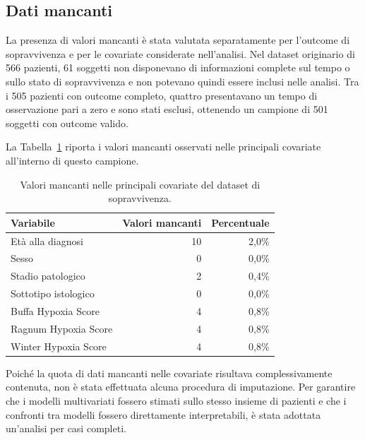 \documentclass[12pt,a4paper]{article}
\begin{document}
\subsection{Dati mancanti}

La presenza di valori mancanti è stata valutata separatamente per l'outcome di sopravvivenza e per le covariate considerate nell'analisi. Nel dataset originario di 566 pazienti, 61 soggetti non disponevano di informazioni complete sul tempo o sullo stato di sopravvivenza e non potevano quindi essere inclusi nelle analisi. Tra i 505 pazienti con outcome completo, quattro presentavano un tempo di osservazione pari a zero e sono stati esclusi, ottenendo un campione di 501 soggetti con outcome valido.

La Tabella~\ref{tab:dati_mancanti} riporta i valori mancanti osservati nelle principali covariate all'interno di questo campione.

\begin{table}[H]
\centering
\caption{Valori mancanti nelle principali covariate del dataset di sopravvivenza.}
\label{tab:dati_mancanti}

\renewcommand{\arraystretch}{1.2}
\setlength{\tabcolsep}{10pt}

\begin{tabular}{l r r}
\toprule
\textbf{Variabile} &
\textbf{Valori mancanti} &
\textbf{Percentuale} \\
\midrule

Età alla diagnosi
& 10
& 2,0\% \\

Sesso
& 0
& 0,0\% \\

Stadio patologico
& 2
& 0,4\% \\

Sottotipo istologico
& 0
& 0,0\% \\

Buffa Hypoxia Score
& 4
& 0,8\% \\

Ragnum Hypoxia Score
& 4
& 0,8\% \\

Winter Hypoxia Score
& 4
& 0,8\% \\

\bottomrule
\end{tabular}
\end{table}

Poiché la quota di dati mancanti nelle covariate risultava complessivamente contenuta, non è stata effettuata alcuna procedura di imputazione. Per garantire che i modelli multivariati fossero stimati sullo stesso insieme di pazienti e che i confronti tra modelli fossero direttamente interpretabili, è stata adottata un'analisi per casi completi.
\end{document}

